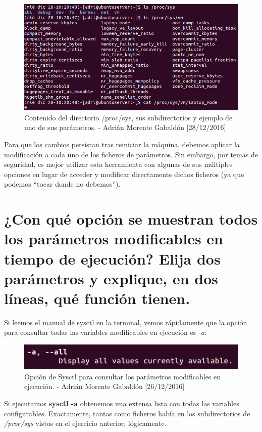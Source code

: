 \begin{figure}[H]
	\centering
	\includegraphics[scale=0.7]{proc-sys}
	\caption{Contenido del directorio /proc/sys, sus subdirectorios y ejemplo de uno de sus parámetros. - Adrián Morente Gabaldón [28/12/2016]}
	\label{figura3}
\end{figure}
Para que los cambios persistan tras reiniciar la máquina, debemos aplicar la modificación a cada uno de los ficheros de parámetros. Sin embargo, por temas de seguridad, es mejor utilizar esta herramienta con algunas de sus múltiples opciones en lugar de acceder y modificar directamente dichos ficheros (ya que podemos ``tocar donde no debemos''). 


\section{¿Con qué opción se muestran todos los parámetros modificables en tiempo de ejecución? Elija dos parámetros y explique, en dos líneas, qué función tienen.}
Si leemos el manual de sysctl en la terminal, vemos rápidamente que la opción para consultar todas las variables modificables en ejecución es \emph{-a}:
\begin{figure}[H]
	\centering
	\includegraphics[scale=0.7]{sysctl-a}
	\caption{Opción de Sysctl para consultar los parámetros modificables en ejecución. - Adrián Morente Gabaldón [26/12/2016]}
	\label{figura2}
\end{figure}
Si ejecutamos \textbf{sysctl -a} obtenemos una extensa lista con todas las variables configurables. Exactamente, tantas como ficheros había en los subdirectorios de \emph{/proc/sys} vistos en el ejercicio anterior, lógicamente.


